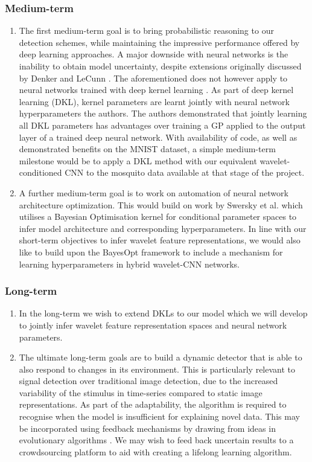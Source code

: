 \documentclass[12pt]{llncs}
\newcommand{\ikn}[1]{\todo[size = \small, color=orange!30]{[ik] #1}}
\begin{document}
\subsubsection{Medium-term}
\begin{enumerate}
	\item The first medium-term goal is to bring probabilistic reasoning to our detection schemes, while maintaining the impressive performance offered by deep learning approaches. A major downside with neural networks is the inability to obtain model uncertainty, despite extensions originally discussed by Denker and LeCunn \cite{denker1991transforming}. The aforementioned does not however apply %
	to neural networks trained with deep kernel learning \cite{wilson2016deep}. As part of deep kernel learning (DKL), kernel parameters are learnt jointly with neural network hyperparameters the authors. The authors demonstrated that jointly learning all DKL parameters has advantages over training a GP applied to the output layer of a trained deep neural network. With availability of code, as well as demonstrated benefits on the MNIST dataset, a simple medium-term milestone would be to apply a DKL method with our equivalent wavelet-conditioned CNN to the mosquito data available at that stage of the project. 
	\item A further medium-term goal is to work on automation of neural network architecture optimization. This would build on work by Swersky et al. \cite{swersky2014raiders} which utilises a Bayesian Optimisation kernel \cite{snoek2012practical} for conditional parameter spaces to infer model architecture and corresponding hyperparameters. In line with our short-term objectives to infer wavelet feature representations, we would also like to build upon the BayesOpt framework to include a mechanism for learning hyperparameters in hybrid wavelet-CNN networks.

\end{enumerate}
\subsubsection{Long-term}
\begin{enumerate}
	\item In the long-term we wish to extend DKLs to our model which we will develop to jointly infer wavelet feature representation spaces and neural network parameters.
	\item The ultimate long-term goals are to build a dynamic detector that is able to also respond to changes in its environment. This is particularly relevant to signal detection over traditional image detection, due to the increased variability of the stimulus in time-series compared to static image representations. As part of the adaptability, the algorithm is required to recognise when the model is insufficient for explaining novel data. This may be incorporated using feedback mechanisms by drawing from ideas in evolutionary algorithms \cite{coello2007evolutionary}. We may wish to feed back uncertain results to a crowdsourcing platform to aid with creating a lifelong learning algorithm.
\end{enumerate}
\end{document}
